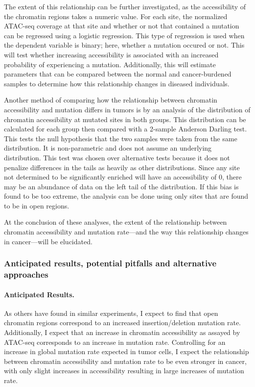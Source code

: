 The extent of this relationship can be further investigated, as the accessibility of the chromatin regions takes a numeric value. For each site, the normalized ATAC-seq coverage at that site and whether or not that contained a mutation can be regressed using a logistic regression. This type of regression is used when the dependent variable is binary; here, whether a mutation occured or not. This will test whether increasing accessibility is associated with an increased probability of experiencing a mutation. Additionally, this will estimate parameters that can be compared between the normal and cancer-burdened samples to determine how this relationship changes in diseased individuals.

Another method of comparing how the relationship between chromatin accessibility and mutation differs in tumors is by an analysis of the distribution of chromatin accessibility at mutated sites in both groups. This distribution can be calculated for each group then compared with a 2-sample Anderson Darling test. This tests the null hypothesis that the two samples were taken from the same distribution. It is non-parametric and does not assume an underlying distribution. This test was chosen over alternative tests because it does not penalize differences in the tails as heavily as other distributions. Since any site not determined to be significantly enriched will have an accessibility of 0, there may be an abundance of data on the left tail of the distribution. If this bias is found to be too extreme, the analysis can be done using only sites that are found to be in open regions.

At the conclusion of these analyses, the extent of the relationship between chromatin accessibility and mutation rate---and the way this relationship changes in cancer---will be elucidated.

\subsubsection{Anticipated results, potential pitfalls and alternative approaches}
\paragraph{Anticipated Results.}
As others have found in similar experiments, I expect to find that open chromatin regions correspond to an increased insertion/deletion mutation rate. Additionally, I expect that an increase in chromatin accessibility as assayed by ATAC-seq corresponds to an increase in mutation rate. Controlling for an increase in global mutation rate expected in tumor cells, I expect the relationship between chromatin accessibility and mutation rate to be even stronger in cancer, with only slight increases in accessibility resulting in large increases of mutation rate.

